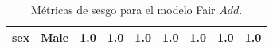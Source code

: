 \documentclass[oneside,openright,titlepage,numbers=noenddot,openany,headinclude,footinclude=true,
cleardoublepage=empty,abstractoff,BCOR=5mm,paper=a4,fontsize=12pt,main=spanish]{scrreprt}
\begin{document}
\begin{table}[H]
{\begin{tabular}{|c|c|c|c|c|c|c|c|c|}
\textbf{sex}                                                      & Male                                                               & {\color[HTML]{3166FF} 1.0}                                       & {\color[HTML]{3166FF} 1.0}                                       & {\color[HTML]{3166FF} 1.0}                                       & {\color[HTML]{3166FF} 1.0}                                       & {\color[HTML]{3166FF} 1.0}                                       & {\color[HTML]{3166FF} 1.0}                                       & {\color[HTML]{3166FF} 1.0}                                       \\ \hline
\end{tabular}
}
\caption{Métricas de sesgo para el modelo Fair $Add$.}
\label{tab:sesgofairadd}
\end{table}
\end{document}
